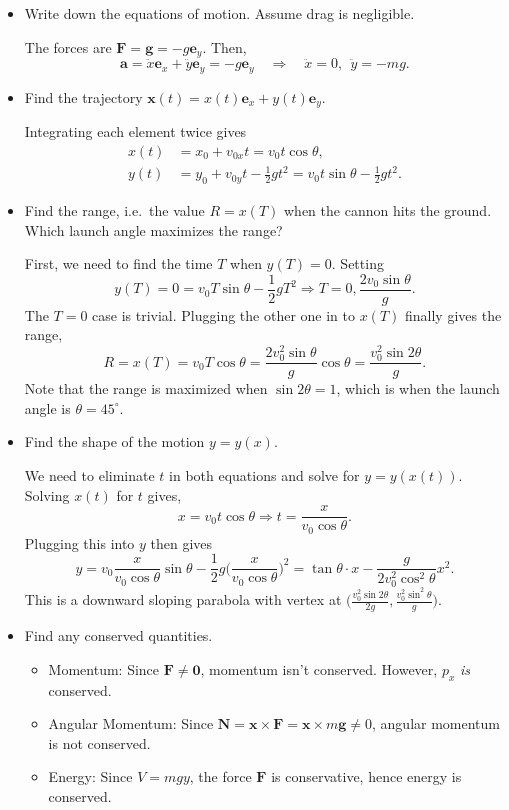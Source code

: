 \documentclass[
  letterpaper,
  DIV=11,
  numbers=noendperiod]{scrreprt}
\providecommand{\tightlist}{%
  \setlength{\itemsep}{0pt}\setlength{\parskip}{0pt}}\usepackage{longtable,booktabs,array}
\begin{document}
\begin{itemize}
\item
  Write down the equations of motion. Assume drag is negligible.

  The forces are \(\mathbf{F} = \mathbf{g} = -g\mathbf{e}_y\). Then, \[
  \mathbf{a} = \ddot x\mathbf{e}_x + \ddot y\mathbf{e}_y = -g\mathbf{e}_y \quad \Longrightarrow \quad   \ddot x = 0, \ \ \ddot y = -mg.
  \]
\item
  Find the trajectory
  \(\mathbf{x}(t) = x(t)\mathbf{e}_x + y(t)\mathbf{e}_y\).

  Integrating each element twice gives \[
  \begin{align*}
  x(t) &= x_0 + v_{0x}t = v_0t \cos \theta, \\
  y(t) &= y_0 + v_{0y}t - \frac{1}{2} gt^2 = v_{0}t\sin \theta - \frac{1}{2} gt^2.
  \end{align*}
  \]
\item
  Find the range, i.e.~the value \(R=x(T)\) when the cannon hits the
  ground. Which launch angle maximizes the range?

  First, we need to find the time \(T\) when \(y(T) = 0\). Setting \[
  y(T) = 0 = v_0 T \sin \theta - \frac{1}{2} gT^2 \Longrightarrow T = 0, \frac{2v_0 \sin \theta}{g}.
  \] The \(T=0\) case is trivial. Plugging the other one in to \(x(T)\)
  finally gives the range, \[
  R = x(T) = v_0T \cos \theta = \frac{2v_0^2 \sin \theta}{g} \cos \theta = \frac{v_0^2 \sin 2\theta}{g}.
  \] Note that the range is maximized when \(\sin 2 \theta = 1\), which
  is when the launch angle is \(\theta = 45^\circ\).
\item
  Find the shape of the motion \(y = y(x)\).

  We need to eliminate \(t\) in both equations and solve for
  \(y=y(x(t))\). Solving \(x(t)\) for \(t\) gives, \[
  x = v_0 t\cos \theta \Longrightarrow t = \frac{x}{v_0 \cos \theta}.
  \] Plugging this into \(y\) then gives \[
  y = v_{0}\frac{x}{v_0 \cos \theta}\sin \theta - \frac{1}{2} g\bigg(\frac{x}{v_0 \cos \theta}\bigg)^2 =  \tan \theta \cdot x - \frac{g}{2v_0^2 \cos^2 \theta} x^2.
  \] This is a downward sloping parabola with vertex at
  \(\big(\frac{v_0^2 \sin 2\theta}{2g}, \frac{v_0^2 \sin^2 \theta}{g}\big)\).
\item
  Find any conserved quantities.

  \begin{itemize}
  \tightlist
  \item
    Momentum: Since \(\mathbf{F} \neq \mathbf{0}\), momentum isn't
    conserved. However, \(p_x\) \emph{is} conserved.
  \item
    Angular Momentum: Since
    \(\mathbf{N} = \mathbf{x} \times \mathbf{F} = \mathbf{x} \times m\mathbf{g} \neq 0\),
    angular momentum is not conserved.
  \item
    Energy: Since \(V=mgy\), the force \(\mathbf{F}\) is conservative,
    hence energy is conserved.
  \end{itemize}
\end{itemize}
\end{document}
